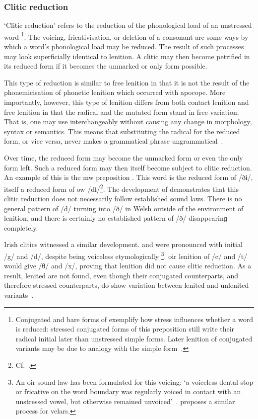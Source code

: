\subsubsection{Clitic reduction}
\label{sec:clitic-reduction}
`Clitic reduction' refers to the reduction of the phonological load of an unstressed word%
\footnote{Conjugated and bare forms of  exemplify how stress influences whether a word is reduced: stressed conjugated forms of this preposition still write their radical initial later than unstressed simple forms. Later lenition of conjugated variants may be due to analogy with the simple form~\autocite[54]{jongeleen_lenition_2016}.}. 
The voicing, fricativisation, or deletion of a consonant are some ways by which a word's phonological load may be reduced.
The result of such processes may look superficially identical to lenition.
A clitic may then become petrified in its reduced form if it becomes the unmarked or only form possible. 

This type of reduction is similar to free lenition in that it is not the result of the phonemicisation of phonetic lenition which occurred with apocope.
More importantly, however, this type of lenition differs from both contact lenition and free lenition in that the radical and the mutated form stand in free variation.
That is, one may use  interchangeably without causing any change in morphology, syntax or semantics. 
This means that substituting the radical for the reduced form, or vice versa, never makes a grammatical phrase ungrammatical~\autocite[451--453]{morgan_y_1952}. 

Over time, the reduced form may become the unmarked form or even the only form left. 
Such a reduced form may then itself become subject to clitic reduction. 
An example of this is the \gls{mw} preposition . 
This word is the reduced form of  /ðɨ/, itself a reduced form of \gls{ow}  /dɨ/\footnote{Cf.\ .}. 
The development of  demonstrates that this clitic reduction does not necessarily follow established sound laws. 
There is no general pattern of /d/ turning into /ð/ in Welsh outside of the environment of lenition, and there is certainly no established pattern of /ð/ disappearinɡ completely.

Irish clitics witnessed a similar development.  
 and  were pronounced with initial /g/ and /d/, despite being voiceless etymologically%
\footnote{
  An \gls{oir} sound law has been formulated for this voicing: `a voiceless dental stop or fricative on the word boundary was regularly voiced in contact with an unstressed vowel, but otherwise remained unvoiced'~\autocite[42]{mccone_final_1981}. 
  \Textcite[43]{jongeleen_lenition_2016} proposes a similar process for velars.
}.
\Gls{oir} lenition of /c/ and /t/ would give /θ/ and /x/, proving that lenition did not cause clitic reduction.
As a result, lenited  are not found, even though their conjugated counterparts, and therefore stressed counterparts, do show variation between lenited and unlenited variants~\autocite[43]{jongeleen_lenition_2016}.

